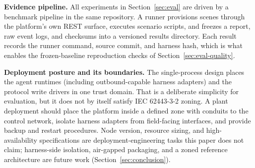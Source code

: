\textbf{Evidence pipeline.} All experiments in Section~\ref{sec:eval} are
driven by a benchmark pipeline in the same repository. A runner provisions
scenes through the platform's own REST surface, executes scenario scripts,
and freezes a report, raw event logs, and checksums into a versioned
results directory. Each result records the runner command, source commit,
and harness hash, which is what enables the frozen-baseline reproduction
checks of Section~\ref{sec:eval-quality}.

\textbf{Deployment posture and its boundaries.} The single-process design
places the agent runtimes (including outbound-capable harness adapters) and
the protocol write drivers in one trust domain. That is a deliberate
simplicity for evaluation, but it does not by itself satisfy IEC 62443-3-2
zoning. A plant deployment should place the platform inside a defined zone
with conduits to the control network, isolate harness adapters from
field-facing interfaces, and provide backup and restart procedures. Node
version, resource sizing, and high-availability specifications are
deployment-engineering tasks this paper does not claim; harness-side
isolation, air-gapped packaging, and a zoned reference architecture are
future work (Section~\ref{sec:conclusion}).
